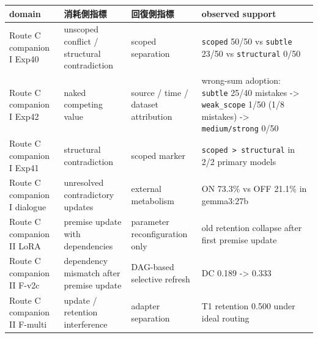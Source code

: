 \documentclass[12pt,a4paper]{article}
\begin{document}
{\def\LTcaptype{table} %
\begin{longtable}[]{@{}
  >{\raggedright\arraybackslash}p{}
  >{\raggedright\arraybackslash}p{}
  >{\raggedright\arraybackslash}p{}
  >{\raggedright\arraybackslash}p{}@{}}
\toprule\noalign{}
\begin{minipage}[b]{\linewidth}\raggedright
domain
\end{minipage} & \begin{minipage}[b]{\linewidth}\raggedright
消耗側指標
\end{minipage} & \begin{minipage}[b]{\linewidth}\raggedright
回復側指標
\end{minipage} & \begin{minipage}[b]{\linewidth}\raggedright
observed support
\end{minipage} \\
\midrule\noalign{}
\endhead
\bottomrule\noalign{}
\endlastfoot
Route C companion I Exp40 & unscoped conflict / structural contradiction & scoped separation & \texttt{scoped} 50/50 vs \texttt{subtle} 23/50 vs \texttt{structural} 0/50 \\
Route C companion I Exp42 & naked competing value & source / time / dataset attribution & wrong-sum adoption: \texttt{subtle} 25/40 mistakes -\textgreater{} \texttt{weak\_scope} 1/50 (1/8 mistakes) -\textgreater{} \texttt{medium/strong} 0/50 \\
Route C companion I Exp41 & structural contradiction & scoped marker & \texttt{scoped\ \textgreater{}\ structural} in 2/2 primary models \\
Route C companion I dialogue & unresolved contradictory updates & external metabolism & ON 73.3\% vs OFF 21.1\% in gemma3:27b \\
Route C companion II LoRA & premise update with dependencies & parameter reconfiguration only & old retention collapse after first premise update \\
Route C companion II F-v2c & dependency mismatch after premise update & DAG-based selective refresh & DC 0.189 -\textgreater{} 0.333 \\
Route C companion II F-multi & update / retention interference & adapter separation & T1 retention 0.500 under ideal routing \\
\end{longtable}
}
\end{document}
